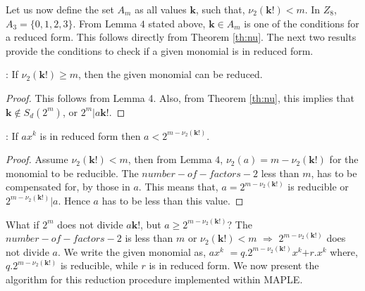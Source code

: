 Let us now define the set $A_m$ as all values $\textbf{k}$, such that, $\nu_2(\textbf{k!}) < m $. In $Z_8$, $A_3 = \{0,1,2,3\}$. From Lemma $4$ stated above, $\textbf{k} \in A_m$ is one of the conditions for a reduced form. This follows directly from Theorem \ref{th:nu}. The next two results provide the conditions to check if a given monomial is in reduced form.

\begin{theorem}: If $\nu_2(\textbf{k!}) \geq m$, then the given monomial can be reduced.
\end{theorem}
\begin{proof}
This follows from Lemma 4. Also, from Theorem \ref{th:nu}, this implies that $\textbf{k} \notin S_d(2^m)$, or $2^m | a\textbf{k!}$.
\end{proof}

\begin{theorem}: If $a$\textbf{$x^{k}$} is in reduced form then $a < 2^{m-\nu_2(\textbf{k!})}$.
\end{theorem}
\begin{proof}
Assume $\nu_2(\textbf{k!}) < m$, then from Lemma $4$, $\nu_2(a) = m - \nu_2(\textbf{k!})$ for the monomial to be reducible.
The $number-of-factors-2$ less than $m$, has to be compensated for, by those in $a$. This means that, $a =
2^{m-\nu_2(\textbf{k!})}$ is reducible or $2^{m-\nu_2(\textbf{k!})}|a$. Hence $a$ has to be less than this value.
\end{proof}

What if $2^m$ does not divide $a\textbf{k!}$, but $a \geq 2^{m-\nu_2(\textbf{k!})}$? The $number-of-factors-2$ is less than
$m$ or $\nu_2(\textbf{k!}) < m$ $\Rightarrow$ $2^{m-\nu_2(\textbf{k!})}$ does not divide $a$. We write the given monomial
as, $a$\textbf{$x^k$} $= q.2^{m-\nu_2(\textbf{k!})}$\textbf{$x^k$}$ + r.$\textbf{$x^k$} where, $q.2^{m-\nu_2(\textbf{k!})}$
is reducible, while $r$ is in reduced form. We now present the algorithm for this reduction procedure implemented within MAPLE.

